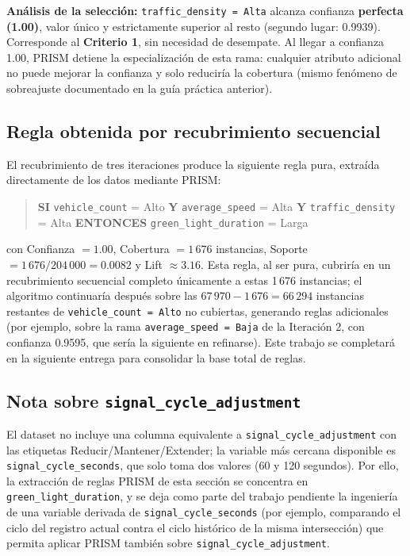 \documentclass[12pt,a4paper]{article}
\begin{document}
\textbf{Análisis de la selección:} \texttt{traffic\_density = Alta}
alcanza confianza \textbf{perfecta (1.00)}, valor único y estrictamente
superior al resto (segundo lugar: 0.9939). Corresponde al
\textbf{Criterio 1}, sin necesidad de desempate. Al llegar a confianza
1.00, PRISM detiene la especialización de esta rama: cualquier atributo
adicional no puede mejorar la confianza y solo reduciría la cobertura
(mismo fenómeno de sobreajuste documentado en la guía práctica anterior).

\subsection{Regla obtenida por recubrimiento secuencial}

El recubrimiento de tres iteraciones produce la siguiente regla pura,
extraída directamente de los datos mediante PRISM:

\begin{quote}
\textbf{SI} \texttt{vehicle\_count} = Alto \textbf{Y}
\texttt{average\_speed} = Alta \textbf{Y} \texttt{traffic\_density} =
Alta \textbf{ENTONCES} \texttt{green\_light\_duration} = Larga
\end{quote}

con Confianza $=1.00$, Cobertura $=1\,676$ instancias, Soporte
$=1\,676/204\,000=0.0082$ y Lift $\approx 3.16$. Esta regla, al ser pura,
cubriría en un recubrimiento secuencial completo únicamente a estas
1\,676 instancias; el algoritmo continuaría después sobre las
$67\,970-1\,676=66\,294$ instancias restantes de \texttt{vehicle\_count =
Alto} no cubiertas, generando reglas adicionales (por ejemplo, sobre la
rama \texttt{average\_speed = Baja} de la Iteración 2, con confianza
0.9595, que sería la siguiente en refinarse). Este trabajo se completará
en la siguiente entrega para consolidar la base total de reglas.

\subsection{Nota sobre \texttt{signal\_cycle\_adjustment}}

El dataset no incluye una columna equivalente a
\texttt{signal\_cycle\_adjustment} con las etiquetas
Reducir/Mantener/Extender; la variable más cercana disponible es
\texttt{signal\_cycle\_seconds}, que solo toma dos valores (60 y 120
segundos). Por ello, la extracción de reglas PRISM de esta sección se
concentra en \texttt{green\_light\_duration}, y se deja como parte del
trabajo pendiente la ingeniería de una variable derivada de
\texttt{signal\_cycle\_seconds} (por ejemplo, comparando el ciclo del
registro actual contra el ciclo histórico de la misma intersección) que
permita aplicar PRISM también sobre \texttt{signal\_cycle\_adjustment}.
\end{document}

